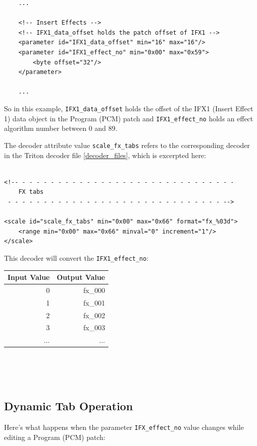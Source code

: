 \documentclass[a4paper,twoside,12pt]{article}
\newcommand{\code}[1]{\color{red}\texttt{#1}\color{black}}
\begin{document}
\begin{verbatim}
    ...

    <!-- Insert Effects -->
    <!-- IFX1_data_offset holds the patch offset of IFX1 -->
    <parameter id="IFX1_data_offset" min="16" max="16"/>
    <parameter id="IFX1_effect_no" min="0x00" max="0x59">
        <byte offset="32"/>
    </parameter>

    ...
\end{verbatim}

So in this example, \code{IFX1\_data\_offset}{} holds the offset
of the IFX1 (Insert Effect 1) data object in the Program (PCM)
patch and \code{IFX1\_effect\_no}{} holds an effect algorithm
number between 0 and 89.

The decoder attribute value \code{scale\_fx\_tabs}{} refers to the
corresponding decoder in the Triton decoder file
\ref{decoder_files}, which is excerpted here:

\begin{verbatim}

<!-- - - - - - - - - - - - - - - - - - - - - - - - - - - - - - -
    FX tabs
 - - - - - - - - - - - - - - - - - - - - - - - - - - - - - - -->

<scale id="scale_fx_tabs" min="0x00" max="0x66" format="fx_%03d">
    <range min="0x00" max="0x66" minval="0" increment="1"/>
</scale>
\end{verbatim}

This decoder will convert the \code{IFX1\_effect\_no}:
\begin{tabular}{|r|r|} \hline
Input Value & Output Value \\
\hline
0 & fx\_000 \\
1 & fx\_001 \\
2 & fx\_002 \\
3 & fx\_003 \\
... & ... \\
\hline
\end{tabular}
\\
\\
\\

\subsection{Dynamic Tab Operation}

Here's what happens when the parameter \code{IFX\_effect\_no}{}
value changes while editing a Program (PCM) patch:
\end{document}
